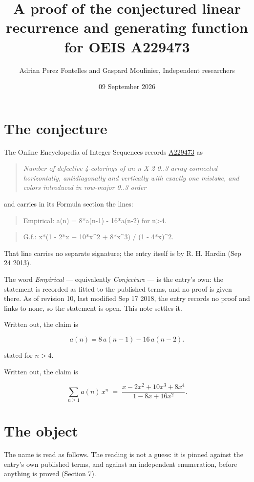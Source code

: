 \documentclass[11pt]{article}
\title{A proof of the conjectured linear recurrence and generating function for OEIS A229473}
\author{Adrian Perez Fontelles and Gaspard Moulinier, Independent researchers}
\date{09 September 2026}
\theoremstyle{definition}
\begin{document}
\maketitle
\section{The conjecture}

The Online Encyclopedia of Integer Sequences records \href{https://oeis.org/A229473}{A229473} as

\begin{quote}\itshape Number of defective 4-colorings of an n X 2 0..3 array connected horizontally, antidiagonally and vertically with exactly one mistake, and colors introduced in row-major 0..3 order\end{quote}

and carries in its Formula section the lines:

\begin{quote}\ttfamily Empirical: a(n) = 8*a(n-1) - 16*a(n-2) for n>4.\end{quote}

\begin{quote}\ttfamily G.f.: x*(1 - 2*x + 10*x\textasciicircum{}2 + 8*x\textasciicircum{}3) / (1 - 4*x)\textasciicircum{}2.\end{quote}

That line carries no separate signature; the entry itself is by R. H. Hardin (Sep 24 2013).

The word {\itshape Empirical} --- equivalently {\itshape Conjecture} --- is the entry's own: the statement is recorded as fitted to the published terms, and no proof is given there. As of revision 10, last modified Sep 17 2018, the entry records no proof and links to none, so the statement is open. This note settles it.

Written out, the claim is

\[a(n) = 8\,a(n-1) - 16\,a(n-2).\]

stated for $n > 4$.

Written out, the claim is

\[\sum_{n \ge 1} a(n)\,x^n \;=\; \frac{x - 2x^{2} + 10x^{3} + 8x^{4}}{1 - 8x + 16x^{2}}.\]

\section{The object}

The name is read as follows. The reading is not a guess: it is pinned against the entry's own published terms, and against an independent enumeration, before anything is proved (Section 7).
\end{document}
